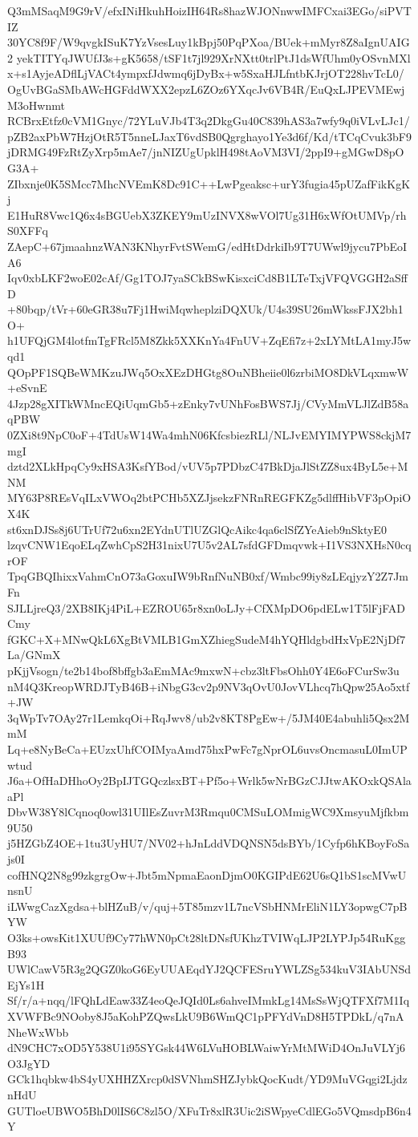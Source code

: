 Q3mMSaqM9G9rV/efxINiHkuhHoizIH64Rs8hazWJONnwwIMFCxai3EGo/siPVTIZ
30YC8f9F/W9qvgkISuK7YzVsesLuy1kBpj50PqPXoa/BUek+mMyr8Z8aIgnUAIG2
yekTITYqJWUfJ3s+gK5658/tSF1t7jl929XrNXtt0trlPtJ1dsWfUhm0yOSvnMXl
x+s1AyjeADflLjVACt4ympxfJdwmq6jDyBx+w5SxaHJLfntbKJrjOT228hvTcL0/
OgUvBGaSMbAWcHGFddWXX2epzL6ZOz6YXqcJv6VB4R/EuQxLJPEVMEwjM3oHwnmt
RCBrxEtfz0cVM1Gnyc/72YLuVJb4T3q2DkgGu40C839hAS3a7wfy9q0iVLvLJc1/
pZB2axPbW7HzjOtR5T5nneLJaxT6vdSB0Qgrghayo1Ye3d6f/Kd/tTCqCvuk3bF9
jDRMG49FzRtZyXrp5mAe7/jnNIZUgUpklH498tAoVM3VI/2ppI9+gMGwD8pOG3A+
ZIbxnje0K5SMcc7MhcNVEmK8Dc91C++LwPgeaksc+urY3fugia45pUZafFikKgKj
E1HuR8Vwc1Q6x4sBGUebX3ZKEY9mUzINVX8wVOl7Ug31H6xWfOtUMVp/rhS0XFFq
ZAepC+67jmaahnzWAN3KNhyrFvtSWemG/edHtDdrkiIb9T7UWwl9jycu7PbEoIA6
Iqv0xbLKF2woE02cAf/Gg1TOJ7yaSCkBSwKisxciCd8B1LTeTxjVFQVGGH2aSffD
+80bqp/tVr+60eGR38u7Fj1HwiMqwheplziDQXUk/U4s39SU26mWkssFJX2bh1O+
h1UFQjGM4lotfmTgFRcl5M8Zkk5XXKnYa4FnUV+ZqEfi7z+2xLYMtLA1myJ5wqd1
QOpPF1SQBeWMKzuJWq5OxXEzDHGtg8OuNBheiie0l6zrbiMO8DkVLqxmwW+eSvnE
4Jzp28gXITkWMncEQiUqmGb5+zEnky7vUNhFosBWS7Jj/CVyMmVLJlZdB58aqPBW
0ZXi8t9NpC0oF+4TdUsW14Wa4mhN06KfcsbiezRLl/NLJvEMYIMYPWS8ckjM7mgI
dztd2XLkHpqCy9xHSA3KsfYBod/vUV5p7PDbzC47BkDjaJlStZZ8ux4ByL5e+MNM
MY63P8REsVqILxVWOq2btPCHb5XZJjsekzFNRnREGFKZg5dlffHibVF3pOpiOX4K
st6xnDJSs8j6UTrUf72u6xn2EYdnUTlUZGlQcAikc4qa6clSfZYeAieb9nSktyE0
lzqvCNW1EqoELqZwhCpS2H31nixU7U5v2AL7sfdGFDmqvwk+I1VS3NXHsN0cqrOF
TpqGBQIhixxVahmCnO73aGoxuIW9bRnfNuNB0xf/Wmbc99iy8zLEqjyzY2Z7JmFn
SJLLjreQ3/2XB8IKj4PiL+EZROU65r8xn0oLJy+CfXMpDO6pdELw1T5lFjFADCmy
fGKC+X+MNwQkL6XgBtVMLB1GmXZhiegSudeM4hYQHldgbdHxVpE2NjDf7La/GNmX
pKjjVsogn/te2b14bof8bffgb3aEmMAc9mxwN+cbz3ltFbsOhh0Y4E6oFCurSw3u
nM4Q3KreopWRDJTyB46B+iNbgG3cv2p9NV3qOvU0JovVLhcq7hQpw25Ao5xtf+JW
3qWpTv7OAy27r1LemkqOi+RqJwv8/ub2v8KT8PgEw+/5JM40E4abuhli5Qsx2MmM
Lq+e8NyBeCa+EUzxUhfCOIMyaAmd75hxPwFc7gNprOL6uvsOncmasuL0ImUPwtud
J6a+OfHaDHhoOy2BpIJTGQczlsxBT+Pf5o+Wrlk5wNrBGzCJJtwAKOxkQSAlaaPl
DbvW38Y8lCqnoq0owl31UIlEsZuvrM3Rmqu0CMSuLOMmigWC9XmsyuMjfkbm9U50
j5HZGbZ4OE+1tu3UyHU7/NV02+hJnLddVDQNSN5dsBYb/1Cyfp6hKBoyFoSajs0I
cofHNQ2N8g99zkgrgOw+Jbt5mNpmaEaonDjmO0KGIPdE62U6sQ1bS1scMVwUnsnU
iLWwgCazXgdsa+blHZuB/v/quj+5T85mzv1L7ncVSbHNMrEliN1LY3opwgC7pBYW
O3ks+owsKit1XUUf9Cy77hWN0pCt28ltDNsfUKhzTVIWqLJP2LYPJp54RuKggB93
UWlCawV5R3g2QGZ0koG6EyUUAEqdYJ2QCFESruYWLZSg534kuV3IAbUNSdEjYs1H
Sf/r/a+nqq/lFQhLdEaw33Z4eoQeJQId0Ls6ahveIMmkLg14MsSsWjQTFXf7M1Iq
XVWFBc9NOoby8J5aKohPZQwsLkU9B6WmQC1pPFYdVnD8H5TPDkL/q7nANheWxWbb
dN9CHC7xOD5Y538U1i95SYGsk44W6LVuHOBLWaiwYrMtMWiD4OnJuVLYj6O3JgYD
GCk1hqbkw4bS4yUXHHZXrcp0dSVNhmSHZJybkQocKudt/YD9MuVGqgi2LjdznHdU
GUTloeUBWO5BhD0lIS6C8zl5O/XFuTr8xlR3Uic2iSWpyeCdlEGo5VQmsdpB6n4Y
